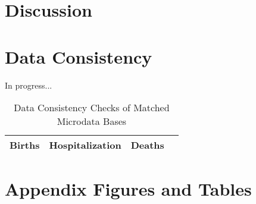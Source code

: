 \documentclass[11pt]{article}
\begin{document}
\begin{spacing}{1.5}
  \clearpage
  \section{Discussion}

  \clearpage
  
  
  \clearpage
  \begin{appendices}
  \setcounter{page}{1}
  \renewcommand{\thepage}{A\arabic{page}}
  \setcounter{table}{0}
  \renewcommand{\thetable}{A\arabic{table}}
  \setcounter{figure}{0}
  \renewcommand{\thefigure}{A\arabic{figure}}



  \section{Data Consistency}

  In progress...
  \begin{table}[htpb!]
    \centering
    \caption{Data Consistency Checks of Matched Microdata Bases}
    \begin{tabular}{lccc} \toprule
      Births & Hospitalization & Deaths \\ \midrule
    \end{tabular}
  \end{table}

  \clearpage
  \section{Appendix Figures and Tables}
    
  \end{appendices}
\end{spacing}
\end{document}
